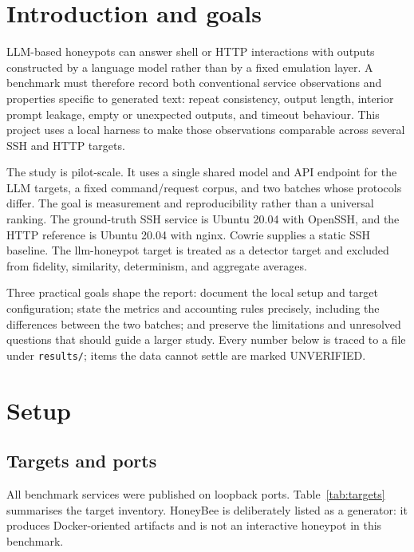 \documentclass[a4paper,11pt]{article}
\begin{document}
\section{Introduction and goals}

LLM-based honeypots can answer shell or HTTP interactions with outputs
constructed by a language model rather than by a fixed emulation layer. A
benchmark must therefore record both conventional service observations and
properties specific to generated text: repeat consistency, output length,
interior prompt leakage, empty or unexpected outputs, and timeout behaviour.
This project uses a local harness to make those observations comparable across
several SSH and HTTP targets.

The study is pilot-scale. It uses a single shared model and API endpoint for
the LLM targets, a fixed command/request corpus, and two batches whose
protocols differ. The goal is measurement and reproducibility rather than a
universal ranking. The ground-truth SSH service is Ubuntu 20.04 with OpenSSH,
and the HTTP reference is Ubuntu 20.04 with nginx. Cowrie supplies a static SSH
baseline. The llm-honeypot target is treated as a detector target and excluded
from fidelity, similarity, determinism, and aggregate averages.

Three practical goals shape the report: document the local setup and target
configuration; state the metrics and accounting rules precisely, including the
differences between the two batches; and preserve the limitations and
unresolved questions that should guide a larger study. Every number below is
traced to a file under \texttt{results/}; items the data cannot settle are
marked UNVERIFIED.

\section{Setup}

\subsection{Targets and ports}

All benchmark services were published on loopback ports. Table~\ref{tab:targets}
summarises the target inventory. HoneyBee is deliberately listed as a
generator: it produces Docker-oriented artifacts and is not an interactive
honeypot in this benchmark.
\end{document}
